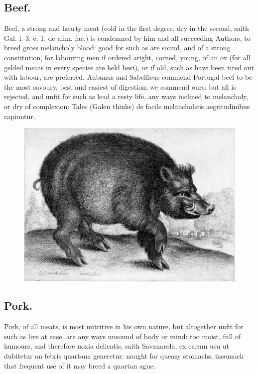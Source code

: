 {\subsection{Beef.}
Beef, a strong and hearty meat (cold in the first degree, dry
in the second, saith Gal. l. 3. c. 1. de alim. fac.) is condemned by
him and all succeeding Authors, to breed gross melancholy blood: good
for such as are sound, and of a strong constitution, for labouring men
if ordered aright, corned, young, of an ox (for all gelded meats in
every species are held best), or if old, such as have been tired
out with labour, are preferred. Aubanus and Sabellicus commend Portugal
beef to be the most savoury, best and easiest of digestion; we commend
ours: but all is rejected, and unfit for such as lead a resty life, any
ways inclined to melancholy, or dry of complexion: Tales (Galen thinks)
de facile melancholicis aegritudinibus capiuntur.
\begin{figure}[H]
  \centering
  \includegraphics[keepaspectratio,width=\textwidth]{figures/wild-boar-small.jpg}
  \caption{}
  \label{fig:wildboar}
\end{figure}
\subsection{Pork.}
Pork, of all meats, is most nutritive in his own nature,
 but altogether unfit for such as live at ease, are any ways
unsound of body or mind: too moist, full of humours, and therefore
noxia delicatis, saith Savanarola, ex earum usu ut dubitetur an febris
quartana generetur: naught for queasy stomachs, insomuch that frequent
use of it may breed a quartan ague.
}
